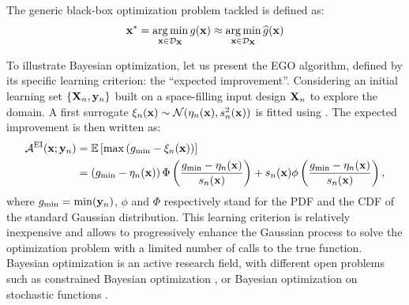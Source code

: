 The generic black-box optimization problem tackled is defined as:
\begin{equation}
    {\bf x}^* = \operatorname*{arg\,min}_{{\bf x} \in \mathcal{D}_{{\bf X}}} g({\bf x}) \approx \operatorname*{arg\,min}_{{\bf x} \in \mathcal{D}_{{\bf X}}} \widehat{g}({\bf x})
\end{equation}

To illustrate Bayesian optimization, let us present the EGO algorithm, defined by its specific learning criterion: the ``expected improvement''. 
Considering an initial learning set $\left\{{\bf X}_n, {\bf y}_n\right\}$ built on a space-filling input design ${\bf X}_n$ to explore the domain. 
A first surrogate $\xi_n({\bf x}) \sim \mathcal{N}(\eta_n({\bf x}), s_n^2({\bf x}))$ is fitted using . 
The expected improvement is then written as: 
\begin{align}
    \mathcal{A}^{\textrm{EI}}({\bf x}; {\bf y}_n) &= \mathbb{E}\left[\max\left(g_{\min} - \xi_n({\bf x})\right)\right] \\ 
                                  &=\left(g_{\min} - \eta_n({\bf x})\right) \Phi\left( \frac{g_{\min} - \eta_n({\bf x})}{s_n({\bf x})}\right) + 
                                    s_n({\bf x}) \phi\left(\frac{g_{\min} - \eta_n({\bf x})}{s_n({\bf x})}\right),
    \label{eq:exp_improvement}
\end{align}
where $g_{\min} = \min({\bf y}_n)$, $\phi$ and $\Phi$ respectively stand for the PDF and the CDF of the standard Gaussian distribution.
This learning criterion is relatively inexpensive and allows to progressively enhance the Gaussian process to solve the optimization problem with a limited number of calls to the true function. 
Bayesian optimization is an active research field, with different open problems such as constrained Bayesian optimization \citep{petit_2022}, or Bayesian optimization on stochastic functions .

